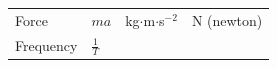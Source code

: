 {{\begin{center}
\begin{tabular}[t]{|l|l|l|l|}
    
        Force &
    
    
        
                \begin{math}ma\end{math}
               &
    
    
        kg\begin{math}\ensuremath{\cdot}\end{math}m\begin{math}\ensuremath{\cdot}\end{math}s\begin{math}{}^{-2}\end{math} &
    
    
        N (newton)%
     \tabularnewline\cline{1-1}\cline{2-2}\cline{3-3}\cline{4-4}
    
    
        Frequency &
    
    
        
                \begin{math}\frac{1}{T}\end{math}
               &
    
    

\end{tabular}
\end{center}}}
